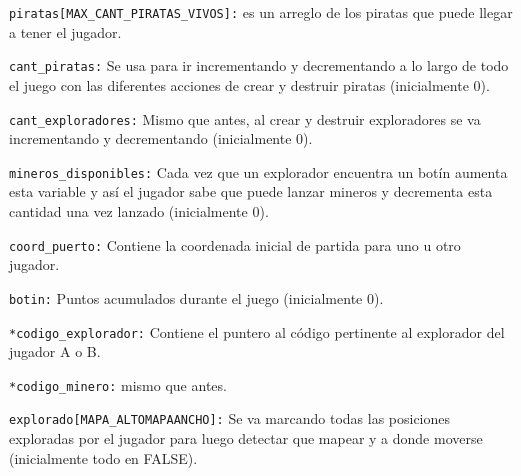 \texttt{piratas[MAX\_CANT\_PIRATAS\_VIVOS]:} es un arreglo de los piratas que puede llegar a tener el jugador.

\texttt{cant\_piratas:} Se usa para ir incrementando y decrementando a lo largo de todo el juego con las diferentes acciones de crear y destruir piratas (inicialmente 0).

\texttt{cant\_exploradores:} Mismo que antes, al crear y destruir exploradores se va incrementando y decrementando (inicialmente 0).

\texttt{mineros\_disponibles:} Cada vez que un explorador encuentra un botín aumenta esta variable y así el jugador sabe que puede lanzar mineros y decrementa esta cantidad una vez lanzado (inicialmente 0).

\texttt{coord\_puerto:} Contiene la coordenada inicial de partida para uno u otro jugador.

\texttt{botin:} Puntos acumulados durante el juego (inicialmente 0).

\texttt{*codigo\_explorador:} Contiene el puntero al código pertinente al explorador del jugador A o B.

\texttt{*codigo\_minero:} mismo que antes.

\texttt{explorado[MAPA\_ALTO\*MAPA\*ANCHO]:} Se va marcando todas las posiciones exploradas por el jugador para luego detectar que mapear y a donde moverse (inicialmente todo en FALSE).

